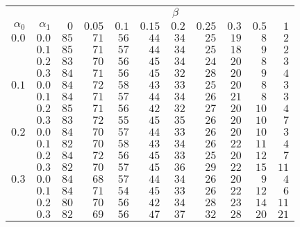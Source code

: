 \begin{tabular}{rr|rrrrrrrrr}
\hline\hline
 && \multicolumn{9}{c}{$\beta$}\\
 $\alpha_0$ & $\alpha_1$ & $0$ & $0.05$ & $0.1$ & $0.15$ & $0.2$ & $0.25$ & $0.3$ & $0.5$ & $1$ \\ 
 \hline
$0.0$ & $0.0$ & $85$ & $71$ & $56$ & $44$ & $34$ & $25$ & $19$ & $8$ & $2$\\ 
 & $0.1$ & $85$ & $71$ & $57$ & $44$ & $34$ & $25$ & $18$ & $9$ & $2$\\ 
 & $0.2$ & $83$ & $70$ & $56$ & $45$ & $34$ & $24$ & $20$ & $8$ & $3$\\ 
 & $0.3$ & $84$ & $71$ & $56$ & $45$ & $32$ & $28$ & $20$ & $9$ & $4$\\ 
\hline 
 $0.1$ & $0.0$ & $84$ & $72$ & $58$ & $43$ & $33$ & $25$ & $20$ & $8$ & $3$\\ 
 & $0.1$ & $84$ & $71$ & $57$ & $44$ & $34$ & $26$ & $21$ & $8$ & $3$\\ 
 & $0.2$ & $85$ & $71$ & $56$ & $42$ & $32$ & $27$ & $20$ & $10$ & $4$\\ 
 & $0.3$ & $83$ & $72$ & $55$ & $45$ & $35$ & $26$ & $20$ & $10$ & $7$\\ 
\hline 
 $0.2$ & $0.0$ & $84$ & $70$ & $57$ & $44$ & $33$ & $26$ & $20$ & $10$ & $3$\\ 
 & $0.1$ & $82$ & $70$ & $58$ & $43$ & $34$ & $26$ & $22$ & $11$ & $4$\\ 
 & $0.2$ & $84$ & $72$ & $56$ & $45$ & $33$ & $25$ & $20$ & $12$ & $7$\\ 
 & $0.3$ & $82$ & $70$ & $57$ & $45$ & $36$ & $29$ & $22$ & $15$ & $11$\\ 
\hline 
 $0.3$ & $0.0$ & $84$ & $68$ & $57$ & $44$ & $34$ & $26$ & $20$ & $9$ & $4$\\ 
 & $0.1$ & $84$ & $71$ & $54$ & $45$ & $33$ & $26$ & $22$ & $12$ & $6$\\ 
 & $0.2$ & $80$ & $70$ & $56$ & $42$ & $34$ & $28$ & $23$ & $14$ & $11$\\ 
 & $0.3$ & $82$ & $69$ & $56$ & $47$ & $37$ & $32$ & $28$ & $20$ & $21$\\ 
 \hline 
 \end{tabular}